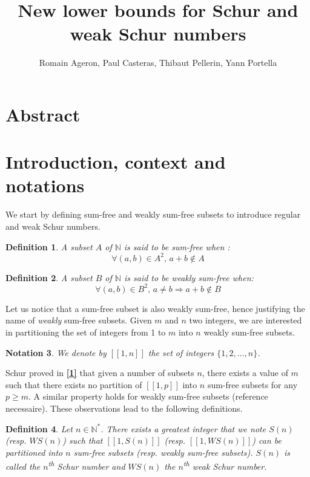 \documentclass{article}
\title{New lower bounds for Schur and weak Schur numbers}
\author{Romain Ageron, Paul Casteras, Thibaut Pellerin, Yann Portella}
\newtheorem{definition}{Definition}[section]
\newtheorem{notation}[definition]{Notation}
\newtheorem{computational theorem}{Computational Theorem}[section]
\begin{document}
\maketitle

\section{Abstract}



\section{Introduction, context and notations}

We start by defining sum-free and weakly sum-free subsets to introduce regular and weak Schur numbers.

\begin{definition}
A subset \(A\) of \(\mathbb{N}\) is said to be \textit{sum-free} when :
\[ \forall (a,b) \in A^2 \text{, } a+b \notin A\]
\end{definition}

\begin{definition}
A subset \(B\) of \(\mathbb{N}\) is said to be \textit{weakly sum-free} when:
\[ \forall (a,b) \in B^2 \text{, } a \neq b \Longrightarrow a+b \notin B\]
\end{definition}

Let us notice that a sum-free subset is also weakly sum-free, hence justifying the name of \textit{weakly} sum-free
subsets. Given \(m\) and \(n\) two integers, we are interested in partitioning the set of integers from 1 to \(m\) into
\(n\) weakly sum-free subsets.

\begin{notation}
We denote by \([\![1,n]\!]\) the set of integers \(\{1, 2, ..., n\}\).
\end{notation}

Schur proved in \hyperlink{label1}{\textbf{[1]}} that given a number of subsets \(n\), there exists a value of \(m\)
such that there exists no partition of \([\![1,p]\!]\) into \(n\) sum-free subsets for any \(p \geqslant m\). A similar
property holds for weakly sum-free subsets (reference necessaire). These observations lead to the following definitions.

\begin{definition}
Let \(n \in \mathbb{N}^*\). There exists a greatest integer that we note \(S(n)\) (\textit{resp. \(WS(n)\)}) such that
\([\![1,S(n)]\!]\) (resp. \([\![1,WS(n)]\!]\)) can be partitioned into \(n\) sum-free subsets (resp. weakly sum-free
subsets). \(S(n)\) is called the \textit{\(n\)\textsuperscript{th} Schur number} and \textit{\(WS(n)\) the \(n\)\textsuperscript{th} weak
Schur number}.
\end{definition}
\end{document}
